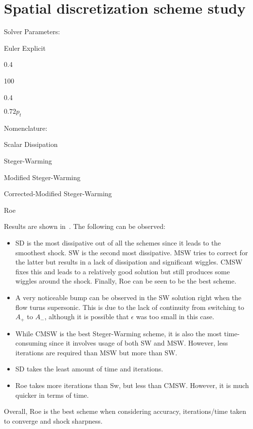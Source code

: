 \section{Spatial discretization scheme study}
Solver Parameters:
\begin{description}[noitemsep]
    \item[Timestepping Scheme:] Euler Explicit
    \item[CFL:] 0.4
    \item[Grid Points:] 100
    \item[$\epsilon$:] 0.4
    \item[\pexit:] $0.72 p_t$
\end{description}
Nomenclature:
\begin{description}[noitemsep]
    \item[SD:] Scalar Dissipation
    \item[SW:] Steger-Warming
    \item[MSW:] Modified Steger-Warming
    \item[CMSW:] Corrected-Modified Steger-Warming
    \item[Roe:] Roe
\end{description}

Results are shown in~. The following can be observed:
\begin{itemize}
    \item SD is the most dissipative out of all the schemes since it leads to the smoothest
        shock. SW is the second most dissipative. MSW tries to correct for the latter
        but results in a lack of dissipation and significant wiggles.
        CMSW fixes this and leads to a relatively
        good solution but still produces some wiggles around the shock. Finally, Roe
        can be seen to be the best scheme.
    \item A very noticeable bump can be observed in the SW solution right when the flow
        turns supersonic. This is due to the lack of continuity from switching to
        $A_+$ to $A_-$, although it is possible that $\epsilon$ was too small
        in this case.
    \item While CMSW is the best Steger-Warming scheme, it is also the most time-consuming
        since it involves usage of both SW and MSW. However, less iterations are required
        than MSW but more than SW.
    \item SD takes the least amount of time and iterations.
    \item Roe takes more iterations than Sw, but less than CMSW. However, it is much quicker
        in terms of time.
\end{itemize}
Overall, Roe is the best scheme when considering accuracy, iterations/time taken to
converge and shock sharpness.


